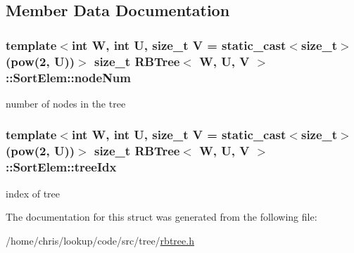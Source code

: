 \subsection{Member Data Documentation}
\hypertarget{structRBTree_1_1SortElem_a143eefad3494abf1f6ef9d5a48dd52d7}{
\subsubsection[{node\-Num}]{\setlength{\rightskip}{0pt plus 5cm}template$<$int W, int U, size\-\_\-t V = static\-\_\-cast$<$size\-\_\-t$>$(pow(2, U))$>$ size\-\_\-t {\bf R\-B\-Tree}$<$ {\bf W}, U, V $>$\-::Sort\-Elem\-::node\-Num}}\label{structRBTree_1_1SortElem_a143eefad3494abf1f6ef9d5a48dd52d7}


number of nodes in the tree 

\hypertarget{structRBTree_1_1SortElem_a9a4b75ae33bc04745caab1b10d6f4e1b}{
\subsubsection[{tree\-Idx}]{\setlength{\rightskip}{0pt plus 5cm}template$<$int W, int U, size\-\_\-t V = static\-\_\-cast$<$size\-\_\-t$>$(pow(2, U))$>$ size\-\_\-t {\bf R\-B\-Tree}$<$ {\bf W}, U, V $>$\-::Sort\-Elem\-::tree\-Idx}}\label{structRBTree_1_1SortElem_a9a4b75ae33bc04745caab1b10d6f4e1b}


index of tree 



The documentation for this struct was generated from the following file\-:\begin{DoxyCompactItemize}
\item 
/home/chris/lookup/code/src/tree/\hyperlink{rbtree_8h}{rbtree.\-h}\end{DoxyCompactItemize}
